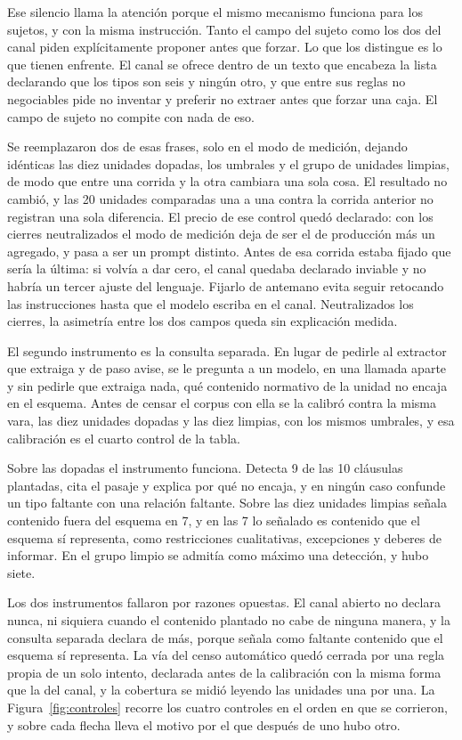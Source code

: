 \documentclass[12pt,a4paper]{report}
\begin{document}
Ese silencio llama la atención porque el mismo mecanismo funciona para los sujetos, y con la misma instrucción. Tanto el campo del sujeto como los dos del canal piden explícitamente proponer antes que forzar. Lo que los distingue es lo que tienen enfrente. El canal se ofrece dentro de un texto que encabeza la lista declarando que los tipos son seis y ningún otro, y que entre sus reglas no negociables pide no inventar y preferir no extraer antes que forzar una caja. El campo de sujeto no compite con nada de eso.

Se reemplazaron dos de esas frases, solo en el modo de medición, dejando idénticas las diez unidades dopadas, los umbrales y el grupo de unidades limpias, de modo que entre una corrida y la otra cambiara una sola cosa. El resultado no cambió, y las 20 unidades comparadas una a una contra la corrida anterior no registran una sola diferencia. El precio de ese control quedó declarado: con los cierres neutralizados el modo de medición deja de ser el de producción más un agregado, y pasa a ser un prompt distinto. Antes de esa corrida estaba fijado que sería la última: si volvía a dar cero, el canal quedaba declarado inviable y no habría un tercer ajuste del lenguaje. Fijarlo de antemano evita seguir retocando las instrucciones hasta que el modelo escriba en el canal. Neutralizados los cierres, la asimetría entre los dos campos queda sin explicación medida.

El segundo instrumento es la consulta separada. En lugar de pedirle al extractor que extraiga y de paso avise, se le pregunta a un modelo, en una llamada aparte y sin pedirle que extraiga nada, qué contenido normativo de la unidad no encaja en el esquema. Antes de censar el corpus con ella se la calibró contra la misma vara, las diez unidades dopadas y las diez limpias, con los mismos umbrales, y esa calibración es el cuarto control de la tabla.

Sobre las dopadas el instrumento funciona. Detecta 9 de las 10 cláusulas plantadas, cita el pasaje y explica por qué no encaja, y en ningún caso confunde un tipo faltante con una relación faltante. Sobre las diez unidades limpias señala contenido fuera del esquema en 7, y en las 7 lo señalado es contenido que el esquema sí representa, como restricciones cualitativas, excepciones y deberes de informar. En el grupo limpio se admitía como máximo una detección, y hubo siete.

Los dos instrumentos fallaron por razones opuestas. El canal abierto no declara nunca, ni siquiera cuando el contenido plantado no cabe de ninguna manera, y la consulta separada declara de más, porque señala como faltante contenido que el esquema sí representa. La vía del censo automático quedó cerrada por una regla propia de un solo intento, declarada antes de la calibración con la misma forma que la del canal, y la cobertura se midió leyendo las unidades una por una. La Figura~\ref{fig:controles} recorre los cuatro controles en el orden en que se corrieron, y sobre cada flecha lleva el motivo por el que después de uno hubo otro.
\end{document}
